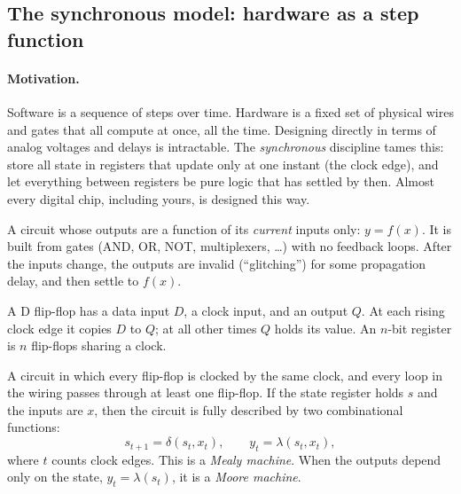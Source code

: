 \subsection{The synchronous model: hardware as a step function}\label{sec:sync}

\paragraph{Motivation.} Software is a sequence of steps over time. Hardware is
a fixed set of physical wires and gates that all compute at once, all the
time. Designing directly in terms of analog voltages and delays is
intractable. The \emph{synchronous} discipline tames this: store all state in
registers that update only at one instant (the clock edge), and let
everything between registers be pure logic that has settled by then. Almost
every digital chip, including yours, is designed this way.

\begin{definition}
A circuit whose outputs are a function of its \emph{current} inputs only:
$y = f(x)$. It is built from gates (AND, OR, NOT, multiplexers, \ldots) with
no feedback loops. After the inputs change, the outputs are invalid
(``glitching'') for some propagation delay, and then settle to $f(x)$.
\end{definition}

\begin{definition}
A D flip-flop has a data input $D$, a clock input, and an output $Q$. At each
rising clock edge it copies $D$ to $Q$; at all other times $Q$ holds its
value. An $n$-bit register is $n$ flip-flops sharing a clock.
\end{definition}

\begin{definition}
A circuit in which every flip-flop is clocked by the same clock, and every
loop in the wiring passes through at least one flip-flop. If the state
register holds $s$ and the inputs are $x$, then the circuit is fully
described by two combinational functions:
\[
  s_{t+1} = \delta(s_t, x_t), \qquad y_t = \lambda(s_t, x_t),
\]
where $t$ counts clock edges. This is a \emph{Mealy machine}. When the outputs
depend only on the state, $y_t=\lambda(s_t)$, it is a \emph{Moore machine}.
\end{definition}

